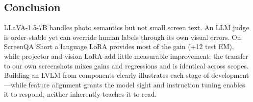 \documentclass[10pt,twocolumn,letterpaper]{article}
\begin{document}
\subsection{Conclusion}

LLaVA-1.5-7B handles photo semantics but not small screen text. An LLM judge is order-stable yet can override human labels through its own visual errors. On ScreenQA Short a language LoRA provides most of the gain (+12 test EM), while projector and vision LoRA add little measurable improvement; the transfer to our own screenshots mixes gains and regressions and is identical across scopes. Building an LVLM from components clearly illustrates each stage of development—while feature alignment grants the model sight and instruction tuning enables it to respond, neither inherently teaches it to read.




{
    \small
    
    
}
\end{document}
